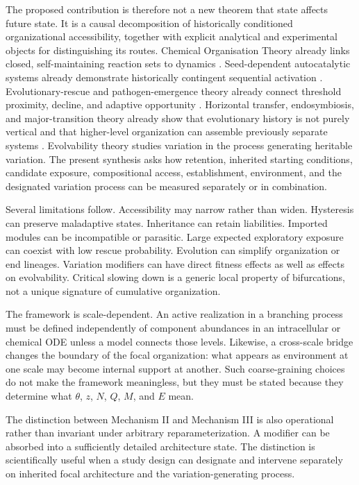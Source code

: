 \documentclass[11pt,a4paper]{article}
\begin{document}
The proposed contribution is therefore not a new theorem that state affects future state. It is a causal decomposition of historically conditioned organizational accessibility, together with explicit analytical and experimental objects for distinguishing its routes. Chemical Organisation Theory already links closed, self-maintaining reaction sets to dynamics \citep{Dittrich2007}. Seed-dependent autocatalytic systems already demonstrate historically contingent sequential activation \citep{Peng2022}. Evolutionary-rescue and pathogen-emergence theory already connect threshold proximity, decline, and adaptive opportunity \citep{Antia2003,Bell2017,Woolhouse2005}. Horizontal transfer, endosymbiosis, and major-transition theory already show that evolutionary history is not purely vertical and that higher-level organization can assemble previously separate systems \citep{Soucy2015,Archibald2015,SzathmarySmith1995}. Evolvability theory studies variation in the process generating heritable variation. The present synthesis asks how retention, inherited starting conditions, candidate exposure, compositional access, establishment, environment, and the designated variation process can be measured separately or in combination.

Several limitations follow. Accessibility may narrow rather than widen. Hysteresis can preserve maladaptive states. Inheritance can retain liabilities. Imported modules can be incompatible or parasitic. Large expected exploratory exposure can coexist with low rescue probability. Evolution can simplify organization or end lineages. Variation modifiers can have direct fitness effects as well as effects on evolvability. Critical slowing down is a generic local property of bifurcations, not a unique signature of cumulative organization.

The framework is scale-dependent. An active realization in a branching process must be defined independently of component abundances in an intracellular or chemical ODE unless a model connects those levels. Likewise, a cross-scale bridge changes the boundary of the focal organization: what appears as environment at one scale may become internal support at another. Such coarse-graining choices do not make the framework meaningless, but they must be stated because they determine what $\theta$, $z$, $N$, $Q$, $M$, and $E$ mean.

The distinction between Mechanism II and Mechanism III is also operational rather than invariant under arbitrary reparameterization. A modifier can be absorbed into a sufficiently detailed architecture state. The distinction is scientifically useful when a study design can designate and intervene separately on inherited focal architecture and the variation-generating process.
\end{document}
